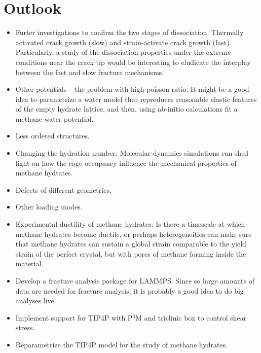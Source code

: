 \section{Outlook}
\begin{itemize}
\item Furter investigations to confirm the two stages of dissociation: Thermally activated crack growth (slow) and strain-activate crack growth (fast). Particularly, a study of the dissociation properties under the extreme conditions near the crack tip would be interesting to eludicate the interplay between the fast and slow fracture mechanisms.
\item Other potentials -- the problem with high poisson ratio. It might be a good idea to parametrize a water model that reproduces reasonable elastic features of the empty hydrate lattice, and then, using ab-initio calculations fit a methane-water potential.
\item Less ordered structures.
\item Changing the hydration number. Molecular dynamics simulations can shed light on how the cage occupancy influence the mechanical properties of methane hydtates.
\item Defects of different geometries.
\item Other loading modes.
\item Experimental ductility of methane hydrates: Is there a timescale at which methane hydrates become ductile, or perhaps heterogeneities can make sure that methane hydrates can sustain a global strain comparable to the yield strain of the perfect crystal, but with pores of methane forming inside the material. 
\item Develop a fracture analysis package for LAMMPS: Since so large amounts of data are needed for fracture analysis, it is probably a good idea to do big analyses live.
\item Implement support for TIP4P with P$^3$M and triclinic box to control shear stress.
\item Reparametrize the TIP4P model for the study of methane hydrates.
\end{itemize}
